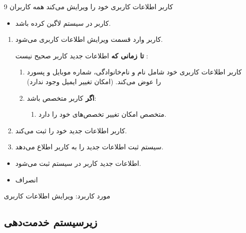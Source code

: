 {
	\usecase
	{}
	{9}
	{کاربر اطلاعات کاربری خود را ویرایش می‌کند}
	{همه کاربران}
	{}
	{
		\begin{itemize}
			\item 
		کاربر در سیستم لاگین کرده باشد.
			
		\end{itemize}
	}
	{
		\begin{enumerate}
			\item 
	کاربر وارد قسمت ویرایش اطلاعات کاربری می‌شود.
	
	\textbf{تا زمانی که} اطلاعات جدید کاربر صحیح نیست :
	
	\begin{enumerate}[label=\theenumi.\arabic*.]
			\item
	کاربر اطلاعات کاربری خود شامل نام و نام‌خانوادگی، شماره موبایل و پسورد را عوض می‌کند. (امکان تغییر ایمیل وجود ندارد)
			
			\item
			\textbf{اگر} کاربر متخصص باشد:
			\begin{enumerate}
				\item 
				متخصص امکان تغییر تخصص‌های خود را دارد.
			\end{enumerate}
			
			\end{enumerate}
		
			\item
			کاربر اطلاعات جدید خود را ثبت می‌کند.
			
			\item
			سیستم ثبت اطلاعات جدید را به کاربر اطلاع می‌دهد.
			
		\end{enumerate}
	}
	{\begin{itemize}
			\item
			اطلاعات جدید کاربر در سیستم ثبت می‌شود.
	\end{itemize}}
	{
		\begin{itemize}
			\item انصراف
		\end{itemize}
	}
	{مورد کاربرد: ویرایش اطلاعات کاربری}
	
	
	
}


\newpage
\subsection{زیرسیستم خدمت‌دهی}

